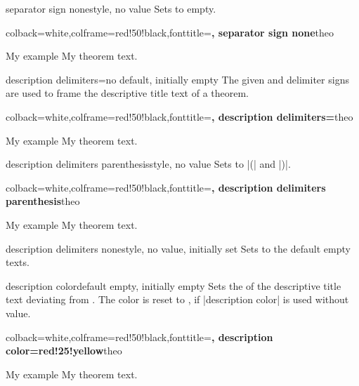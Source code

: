 \begin{docTcbKey}{separator sign none}{}{style, no value}
Sets  to empty.
\begin{dispExample}
%
  {colback=white,colframe=red!50!black,fonttitle=\bfseries,
   separator sign none}{theo}
\begin{sometheorem}{My example}{}
My theorem text.
\end{sometheorem}
\end{dispExample}
\end{docTcbKey}

\clearpage
\begin{docTcbKey}{description delimiters}{=}{no default, initially empty}
  The given  and  delimiter signs are used to frame
  the descriptive title text of a theorem.

\begin{dispExample}
%
  {colback=white,colframe=red!50!black,fonttitle=\bfseries,
   description delimiters={\flqq}{\frqq}}{theo}
\begin{sometheorem}{My example}{}
My theorem text.
\end{sometheorem}
\end{dispExample}
\end{docTcbKey}


\begin{docTcbKey}{description delimiters parenthesis}{}{style, no value}
Sets  to |(| and |)|.
\begin{dispExample}
%
  {colback=white,colframe=red!50!black,fonttitle=\bfseries,
   description delimiters parenthesis}{theo}
\begin{sometheorem}{My example}{}
My theorem text.
\end{sometheorem}
\end{dispExample}
\end{docTcbKey}


\begin{docTcbKey}{description delimiters none}{}{style, no value, initially set}
Sets  to the default empty texts.
\end{docTcbKey}


\begin{docTcbKey}{description color}{}{default empty, initially empty}
  Sets the  of the descriptive title text deviating from .
  The color is reset to , if |description color| is used without value.

\begin{dispExample}
%
  {colback=white,colframe=red!50!black,fonttitle=\bfseries,
   description color=red!25!yellow}{theo}
\begin{sometheorem}{My example}{}
My theorem text.
\end{sometheorem}
\end{dispExample}
\end{docTcbKey}

